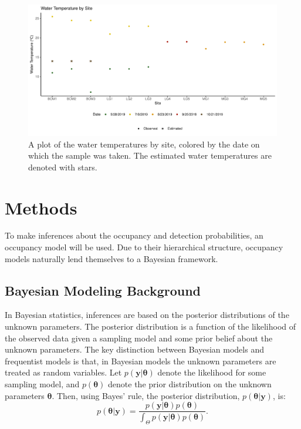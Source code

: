 \documentclass[12pt]{article}\usepackage[]{graphicx}\usepackage[]{color}
\makeatletter
\def\maxwidth{ %
  \ifdim\Gin@nat@width>\linewidth
    \linewidth
  \else
    \Gin@nat@width
  \fi
}
\newenvironment{knitrout}{}{} %
\def\maxwidth{ %
  \ifdim\Gin@nat@width>\linewidth
    \linewidth
  \else
    \Gin@nat@width
  \fi
}
\newenvironment{knitrout}{}{} %
\makeatother
\begin{document}
\begin{figure}[]
\begin{knitrout}
\color{fgcolor}

{\centering \includegraphics[width=\maxwidth]{figure/eDNA_visualization_temp-1} 

}



\end{knitrout}
\caption{A plot of the water temperatures by site, colored by the date on which the sample was taken. The estimated water temperatures are denoted with stars.}
\label{fig:eDNA_temp}
\end{figure}

\section{Methods}

To make inferences about the occupancy and detection probabilities, an occupancy model will be used. Due to their hierarchical structure, occupancy models naturally lend themselves to a Bayesian framework. 

\subsection{Bayesian Modeling Background}

In Bayesian statistics, inferences are based on the posterior distributions of the unknown parameters. The posterior distribution is a function of the likelihood of the observed data given a sampling model and some prior belief about the unknown parameters. The key distinction between Bayesian models and frequentist models is that, in Bayesian models the unknown parameters are treated as random variables. Let $p(\bm{y}|\bm{\theta})$ denote the likelihood for some sampling model, and $p(\bm{\theta})$ denote the prior distribution on the unknown parameters $\bm{\theta}$. Then, using Bayes' rule, the posterior distribution, $p(\bm{\theta}|\bm{y})$, is: 
$$p(\bm{\theta}|\bm{y}) = \frac{p(\bm{y}|\bm{\theta})p(\bm{\theta})}{\int_\Theta p(\bm{y}|\bm{\theta})p(\bm{\theta})}.$$
\end{document}

